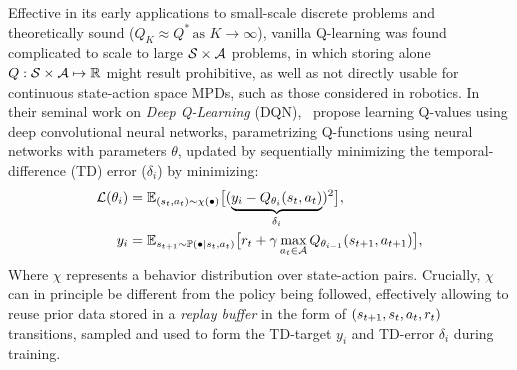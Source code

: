 Effective in its early applications to small-scale discrete problems and theoretically sound (\( Q_K \approx Q^* \, \text{as } K \to \infty \)), vanilla Q-learning was found complicated to scale to large \( \mathcal S \times \mathcal A \) problems, in which storing alone \( Q : \mathcal S \times \mathcal A \mapsto \mathbb R \) might result prohibitive, as well as not directly usable for continuous state-action space MPDs, such as those considered in robotics.
In their seminal work on \emph{Deep Q-Learning} (DQN),~\citet{mnihPlayingAtariDeep2013} propose learning Q-values using deep convolutional neural networks, parametrizing Q-functions using neural networks with parameters \( \theta \), updated by sequentially minimizing the temporal-difference (TD) error (\( \delta_i \)) by minimizing:
\begin{align}
\mathcal L(\theta_i) &= \mathbb E_{(s_t, a_t) \sim \chi(\bullet)} 
    \big[ 
        (\underbrace{y_i - Q_{\theta_i}(s_t, a_t)}_{\delta_i})^2 
    \big], \label{eq:dqn-loss} \\
    y_i &= \mathbb E_{s_{t+1} \sim \mathbb P(\bullet \vert s_t, a_t)} \big[ r_t + \gamma \max_{a_t \in \mathcal A} Q_{\theta_{i-1}} (s_{t+1}, a_{t+1}) \big], \label{eq:TD-target}
\end{align}
Where \( \chi \) represents a behavior distribution over state-action pairs. 
Crucially, \( \chi \) can in principle be different from the policy being followed, effectively allowing to reuse prior data stored in a \emph{replay buffer} in the form of \( (s_{t+1}, s_t, a_t, r_t) \) transitions, sampled and used to form the TD-target \( y_i \) and TD-error \( \delta_i \) during training.

